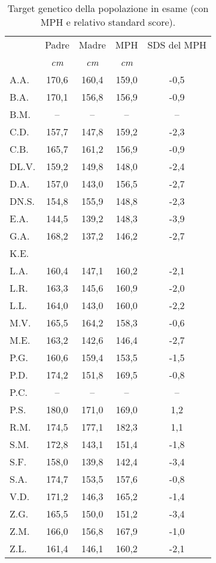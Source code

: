 \begin{table}[!h]
\begin{center}
\addtolength{\tabcolsep}{12pt}
\renewcommand{\arraystretch}{1.1}
\begin{tabular}{lcccc}
\toprule

 & Padre & Madre & MPH & SDS del MPH \\
 & \emph{cm} & \emph{cm} & \emph{cm} & \\
\midrule
A.A.	& 170,6 & 160,4 & 159,0 & -0,5  \\
B.A.	& 170,1 & 156,8 & 156,9 & -0,9  \\
B.M.	& --    & --    & --    & --    \\
C.D.	& 157,7 & 147,8 & 159,2 & -2,3  \\
C.B.	& 165,7 & 161,2 & 156,9 & -0,9  \\
DL.V.	& 159,2 & 149,8 & 148,0 & -2,4  \\
D.A.	& 157,0 & 143,0 & 156,5 & -2,7  \\
DN.S.	& 154,8 & 155,9 & 148,8 & -2,3  \\
E.A.	& 144,5 & 139,2 & 148,3 & -3,9  \\
G.A.	& 168,2 & 137,2 & 146,2 & -2,7  \\
K.E.	&  &  &  &  \\            
L.A.	& 160,4 & 147,1 & 160,2 & -2,1  \\
L.R.	& 163,3 & 145,6 & 160,9 & -2,0  \\
L.L.	& 164,0 & 143,0 & 160,0 & -2,2  \\
M.V.	& 165,5 & 164,2 & 158,3 & -0,6  \\
M.E.	& 163,2 & 142,6 & 146,4 & -2,7  \\
P.G.	& 160,6 & 159,4 & 153,5 & -1,5  \\
P.D.	& 174,2 & 151,8 & 169,5 & -0,8  \\
P.C.	& --    & --    & --    & --    \\
P.S.	& 180,0 & 171,0 & 169,0 & 1,2   \\
R.M.	& 174,5 & 177,1 & 182,3 & 1,1   \\
S.M.	& 172,8 & 143,1 & 151,4 & -1,8  \\
S.F.	& 158,0 & 139,8 & 142,4 & -3,4  \\
S.A.	& 174,7 & 153,5 & 157,6 & -0,8  \\
V.D.	& 171,2 & 146,3 & 165,2 & -1,4  \\
Z.G.	& 165,5 & 150,0 & 151,2 & -3,4  \\
Z.M.	& 166,0 & 156,8 & 167,9 & -1,0  \\
Z.L.	& 161,4 & 146,1 & 160,2 & -2,1  \\
\bottomrule
\end{tabular}
\end{center}
\caption{Target genetico della popolazione in esame (con MPH e relativo standard score).}
\label{tab:TargetGenetici}
\end{table}

